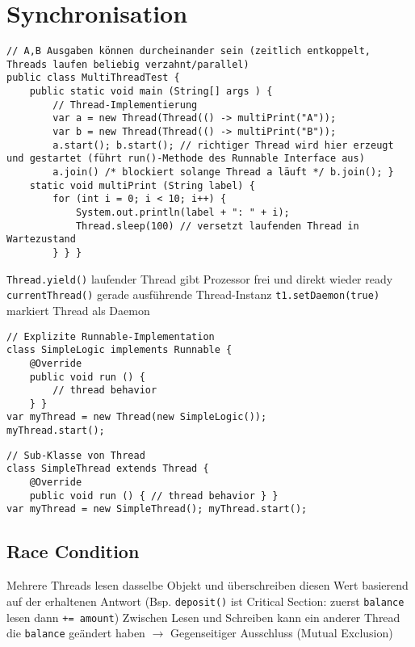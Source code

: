 \section{Synchronisation}

\begin{lstlisting}
// A,B Ausgaben können durcheinander sein (zeitlich entkoppelt, Threads laufen beliebig verzahnt/parallel)
public class MultiThreadTest {
    public static void main (String[] args ) {
        // Thread-Implementierung
        var a = new Thread(Thread(() -> multiPrint("A"));
        var b = new Thread(Thread(() -> multiPrint("B"));
        a.start(); b.start(); // richtiger Thread wird hier erzeugt und gestartet (führt run()-Methode des Runnable Interface aus)
        a.join() /* blockiert solange Thread a läuft */ b.join(); }
    static void multiPrint (String label) {
        for (int i = 0; i < 10; i++) {
            System.out.println(label + ": " + i);
            Thread.sleep(100) // versetzt laufenden Thread in Wartezustand
        } } }
\end{lstlisting}

\lstinline{Thread.yield()} laufender Thread gibt Prozessor frei und direkt wieder ready \lstinline{currentThread()} gerade ausführende Thread-Instanz \lstinline{t1.setDaemon(true)} markiert Thread als Daemon

\begin{minipage}[t]{0.5\linewidth}
    \begin{lstlisting}
// Explizite Runnable-Implementation
class SimpleLogic implements Runnable {
    @Override
    public void run () {
        // thread behavior
    } }
var myThread = new Thread(new SimpleLogic());
myThread.start();
    \end{lstlisting}
\end{minipage}
\begin{minipage}[t]{0.5\linewidth}
    \begin{lstlisting}
// Sub-Klasse von Thread
class SimpleThread extends Thread {
    @Override
    public void run () { // thread behavior } }
var myThread = new SimpleThread(); myThread.start();
    \end{lstlisting}
\end{minipage}

\subsection{Race Condition}
Mehrere Threads lesen dasselbe Objekt und überschreiben diesen Wert basierend auf der erhaltenen Antwort (Bsp. \lstinline{deposit()} ist Critical Section: zuerst \lstinline{balance} lesen dann \lstinline{+= amount}) Zwischen Lesen und Schreiben kann ein anderer Thread die \lstinline{balance} geändert haben $\rightarrow$ Gegenseitiger Ausschluss (Mutual Exclusion)

